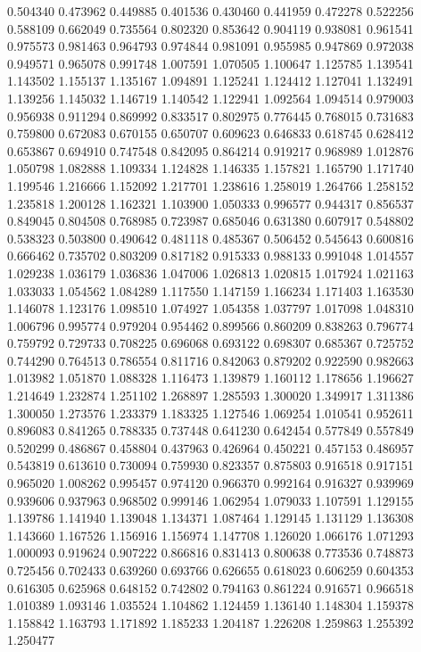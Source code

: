 0.504340
0.473962
0.449885
0.401536
0.430460
0.441959
0.472278
0.522256
0.588109
0.662049
0.735564
0.802320
0.853642
0.904119
0.938081
0.961541
0.975573
0.981463
0.964793
0.974844
0.981091
0.955985
0.947869
0.972038
0.949571
0.965078
0.991748
1.007591
1.070505
1.100647
1.125785
1.139541
1.143502
1.155137
1.135167
1.094891
1.125241
1.124412
1.127041
1.132491
1.139256
1.145032
1.146719
1.140542
1.122941
1.092564
1.094514
0.979003
0.956938
0.911294
0.869992
0.833517
0.802975
0.776445
0.768015
0.731683
0.759800
0.672083
0.670155
0.650707
0.609623
0.646833
0.618745
0.628412
0.653867
0.694910
0.747548
0.842095
0.864214
0.919217
0.968989
1.012876
1.050798
1.082888
1.109334
1.124828
1.146335
1.157821
1.165790
1.171740
1.199546
1.216666
1.152092
1.217701
1.238616
1.258019
1.264766
1.258152
1.235818
1.200128
1.162321
1.103900
1.050333
0.996577
0.944317
0.856537
0.849045
0.804508
0.768985
0.723987
0.685046
0.631380
0.607917
0.548802
0.538323
0.503800
0.490642
0.481118
0.485367
0.506452
0.545643
0.600816
0.666462
0.735702
0.803209
0.817182
0.915333
0.988133
0.991048
1.014557
1.029238
1.036179
1.036836
1.047006
1.026813
1.020815
1.017924
1.021163
1.033033
1.054562
1.084289
1.117550
1.147159
1.166234
1.171403
1.163530
1.146078
1.123176
1.098510
1.074927
1.054358
1.037797
1.017098
1.048310
1.006796
0.995774
0.979204
0.954462
0.899566
0.860209
0.838263
0.796774
0.759792
0.729733
0.708225
0.696068
0.693122
0.698307
0.685367
0.725752
0.744290
0.764513
0.786554
0.811716
0.842063
0.879202
0.922590
0.982663
1.013982
1.051870
1.088328
1.116473
1.139879
1.160112
1.178656
1.196627
1.214649
1.232874
1.251102
1.268897
1.285593
1.300020
1.349917
1.311386
1.300050
1.273576
1.233379
1.183325
1.127546
1.069254
1.010541
0.952611
0.896083
0.841265
0.788335
0.737448
0.641230
0.642454
0.577849
0.557849
0.520299
0.486867
0.458804
0.437963
0.426964
0.450221
0.457153
0.486957
0.543819
0.613610
0.730094
0.759930
0.823357
0.875803
0.916518
0.917151
0.965020
1.008262
0.995457
0.974120
0.966370
0.992164
0.916327
0.939969
0.939606
0.937963
0.968502
0.999146
1.062954
1.079033
1.107591
1.129155
1.139786
1.141940
1.139048
1.134371
1.087464
1.129145
1.131129
1.136308
1.143660
1.167526
1.156916
1.156974
1.147708
1.126020
1.066176
1.071293
1.000093
0.919624
0.907222
0.866816
0.831413
0.800638
0.773536
0.748873
0.725456
0.702433
0.639260
0.693766
0.626655
0.618023
0.606259
0.604353
0.616305
0.625968
0.648152
0.742802
0.794163
0.861224
0.916571
0.966518
1.010389
1.093146
1.035524
1.104862
1.124459
1.136140
1.148304
1.159378
1.158842
1.163793
1.171892
1.185233
1.204187
1.226208
1.259863
1.255392
1.250477
